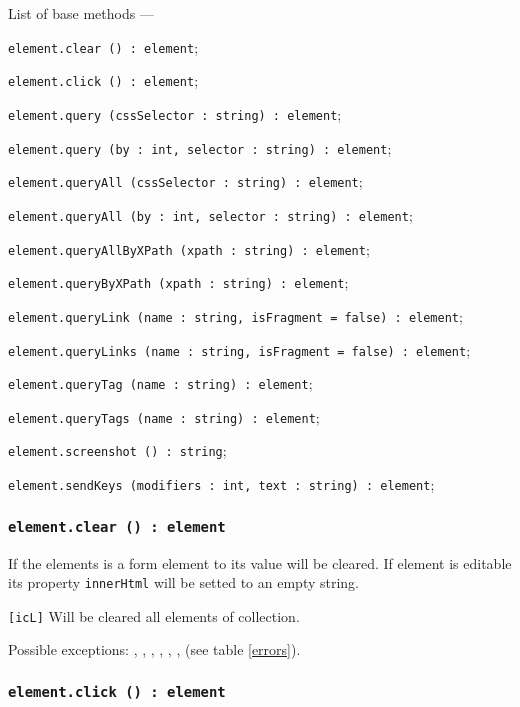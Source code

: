 List of base methods —
\begin{icItems}
\item \texttt{element.clear () : element};
\item \texttt{element.click () : element};
\item \texttt{element.query (cssSelector : string) : element};
\item \texttt{element.query (by : int, selector : string) : element};
\item \texttt{element.queryAll (cssSelector : string) : element};
\item \texttt{element.queryAll (by : int, selector : string) : element};
\item \texttt{element.queryAllByXPath (xpath : string) : element};
\item \texttt{element.queryByXPath (xpath : string) : element};
\item \texttt{element.queryLink (name : string, isFragment = false) : element};
\item \texttt{element.queryLinks (name : string, isFragment = false) : element};
\item \texttt{element.queryTag (name : string) : element};
\item \texttt{element.queryTags (name : string) : element};
\item \texttt{element.screenshot () : string};
\item \texttt{element.sendKeys (modifiers : int, text : string) : element};
\end{icItems}

\subsubsection{\texttt{element.clear () : element}}

If the elements is a form element to its value will be cleared. If element is editable its property \texttt{innerHtml} will be setted to an empty string.

\texttt{[icL]} Will be cleared all elements of collection.

Possible exceptions: , , , , , ,  (see table \ref{errors}).

\subsubsection{\texttt{element.click () : element}}

